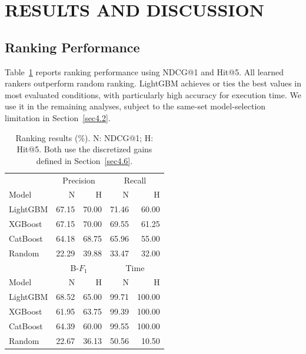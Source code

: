 \section{\uppercase{Results and Discussion}} \label{sec5}
\subsection{Ranking Performance} \label{sec5.1}
Table~\ref{Evaluation_of_Ranking_Prediction_Results} reports ranking performance using NDCG@1 and Hit@5. All learned rankers outperform random ranking. LightGBM achieves or ties the best values in most evaluated conditions, with particularly high accuracy for execution time. We use it in the remaining analyses, subject to the same-set model-selection limitation in Section~\ref{sec4.2}.

\begin{table}[tb]
\centering\small
\caption{Ranking results (\%). N: NDCG@1; H: Hit@5. Both use the discretized gains defined in Section~\ref{sec4.6}.}
\label{Evaluation_of_Ranking_Prediction_Results}
\setlength{\tabcolsep}{3pt}
\begin{tabular}{lrrrr}
\toprule
& \multicolumn{2}{c}{Precision} & \multicolumn{2}{c}{Recall} \\
Model & N & H & N & H \\
\midrule
LightGBM & 67.15 & 70.00 & 71.46 & 60.00 \\
XGBoost & 67.15 & 70.00 & 69.55 & 61.25 \\
CatBoost & 64.18 & 68.75 & 65.96 & 55.00 \\
Random & 22.29 & 39.88 & 33.47 & 32.00 \\
\midrule
& \multicolumn{2}{c}{B-$F_1$} & \multicolumn{2}{c}{Time} \\
Model & N & H & N & H \\
\midrule
LightGBM & 68.52 & 65.00 & 99.71 & 100.00 \\
XGBoost & 61.95 & 63.75 & 99.39 & 100.00 \\
CatBoost & 64.39 & 60.00 & 99.55 & 100.00 \\
Random & 22.67 & 36.13 & 50.56 & 10.50 \\
\bottomrule
\end{tabular}
\end{table}

